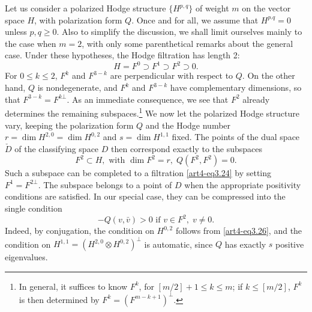 Let us consider a polarized Hodge structure $\{H^{p,q}\}$ of weight $m$ on the vector space $H$, with polarization form $Q$. Once and for all, we assume that $H^{p.q} =0$ unless $p, q \geqslant 0$. Also to simplify the discussion, we shall limit ourselves mainly to the case when $m =2$, with only some parenthetical remarks about the general case. Under these hypotheses, the Hodge filtration has length 2:
\setcounter{equation}{23}
\begin{equation}
H = F^0 \supset F^1 \supset F^2 \supset 0. \label{art4-eq3.24}
\end{equation}
For $0 \leqslant k \leqslant 2$, $F^k$ and $F^{3-k}$ are perpendicular with respect to $Q$. On the other hand, $Q$ is nondegenerate, and $F^k$ and $F^{3-k}$ have complementary dimensions, so that $F^{3-k} = F^{k \bot}$. As an immediate consequence, we see that $F^2$ already determines the remaining subspaces.\footnote[13]{In general, it suffices to know $F^k$, for $[m/2] + 1 \leqslant k \leqslant m$; if $k \leqslant [m/2]$, $F^k$ is then determined by $F^k = (F^{m-k+1})^\bot$.} We now let the polarized Hodge structure vary, keeping the polarization form $Q$ and the Hodge number $r = \dim H^{2,0} = \dim H^{0,2}$ and $s = \dim H^{1,1}$ fixed. The points of the dual space $\check{D}$ of the classifying space $D$ then correspond exactly to the subspaces
\begin{equation}
F^2 \subset H, \text{ with } \dim F^2 = r , \; Q (F^2, F^2) = 0. 
\label{art4-eq3.25}
\end{equation}
Such a subspace can be completed to a filtration  \eqref{art4-eq3.24} by setting $F^1 = F^{2\bot}$. The subspace belongs to a point of $D$ when the appropriate positivity conditions are satisfied. In our special case, they can be compressed into the single condition
\begin{equation}
- Q (v, \bar{v}) > 0 \text{ if } v \in F^2, \; v \neq 0.
\label{art4-eq3.26}
\end{equation}
Indeed, by conjugation, the condition on $H^{0,2}$ follows from \eqref{art4-eq3.26}, and the condition on $H^{1,1} = (H^{2,0} \otimes H^{0,2})^\bot$ is automatic, since $Q$ has exactly $s$ positive eigenvalues.
 
